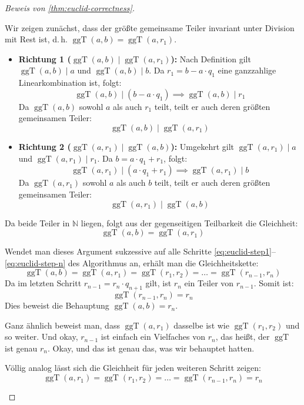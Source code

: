 \begin{proof}[Beweis von \cref{thm:euclid-correctness}]
\begin{math-stroke}
Wir zeigen zunächst, dass der größte gemeinsame Teiler invariant unter Division mit Rest ist, d.\,h. $\operatorname{ggT}(a, b) = \operatorname{ggT}(a, r_1)$.
\begin{itemize}
    \item \textbf{Richtung 1 ($\operatorname{ggT}(a, b) \mid \operatorname{ggT}(a, r_1)$):}
    Nach Definition gilt $\operatorname{ggT}(a, b) \mid a$ und $\operatorname{ggT}(a, b) \mid b$. Da $r_1 = b - a \cdot q_1$ eine ganzzahlige Linearkombination ist, folgt:
    \[ \operatorname{ggT}(a, b) \mid (b - a \cdot q_1) \implies \operatorname{ggT}(a, b) \mid r_1 \]
    Da $\operatorname{ggT}(a, b)$ sowohl $a$ als auch $r_1$ teilt, teilt er auch deren größten gemeinsamen Teiler:
    \[ \operatorname{ggT}(a, b) \mid \operatorname{ggT}(a, r_1) \]
    
    \item \textbf{Richtung 2 ($\operatorname{ggT}(a, r_1) \mid \operatorname{ggT}(a, b)$):}
    Umgekehrt gilt $\operatorname{ggT}(a, r_1) \mid a$ und $\operatorname{ggT}(a, r_1) \mid r_1$. Da $b = a \cdot q_1 + r_1$, folgt:
    \[ \operatorname{ggT}(a, r_1) \mid (a \cdot q_1 + r_1) \implies \operatorname{ggT}(a, r_1) \mid b \]
    Da $\operatorname{ggT}(a, r_1)$ sowohl $a$ als auch $b$ teilt, teilt er auch deren größten gemeinsamen Teiler:
    \[ \operatorname{ggT}(a, r_1) \mid \operatorname{ggT}(a, b) \]
\end{itemize}
Da beide Teiler in $\mathbb{N}$ liegen, folgt aus der gegenseitigen Teilbarkeit die Gleichheit:
\[ \operatorname{ggT}(a, b) = \operatorname{ggT}(a, r_1) \]

Wendet man dieses Argument sukzessive auf alle Schritte \eqref{eq:euclid-step1}--\eqref{eq:euclid-step-n} des Algorithmus an, erhält man die Gleichheitskette:
\[ \operatorname{ggT}(a, b) = \operatorname{ggT}(a, r_1) = \operatorname{ggT}(r_1, r_2) = \dots = \operatorname{ggT}(r_{n-1}, r_n) \]
Da im letzten Schritt $r_{n-1} = r_n \cdot q_{n+1}$ gilt, ist $r_n$ ein Teiler von $r_{n-1}$. Somit ist:
\[ \operatorname{ggT}(r_{n-1}, r_n) = r_n \]
Dies beweist die Behauptung $\operatorname{ggT}(a, b) = r_n$.
\end{math-stroke}

\begin{spoken-clean}[00:37:41 - 00:38:39]
Ganz ähnlich beweist man, dass $\operatorname{ggT}(a, r_1)$ dasselbe ist wie $\operatorname{ggT}(r_1, r_2)$ und so weiter. Und okay, $r_{n-1}$ ist einfach ein Vielfaches von $r_n$, das heißt, der $\operatorname{ggT}$ ist genau $r_n$. Okay, und das ist genau das, was wir behauptet hatten.
\end{spoken-clean}

\begin{math-stroke}
Völlig analog lässt sich die Gleichheit für jeden weiteren Schritt zeigen:
\[ \operatorname{ggT}(a, r_1) = \operatorname{ggT}(r_1, r_2) = \dots = \operatorname{ggT}(r_{n-1}, r_n) = r_n \]
\end{math-stroke}
\end{proof}


